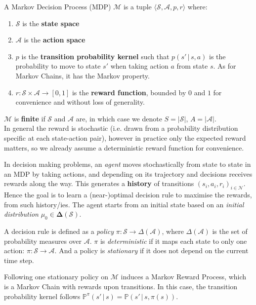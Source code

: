 \begin{defi}
  A Markov Decision Process (MDP) $\mathcal{M}$ is a tuple $\langle \mathcal{S}, \mathcal{A}, p, r \rangle$ where:
  \begin{enumerate}
  \item $\mathcal{S}$ is the \textbf{state space}
  \item $\mathcal{A}$ is the \textbf{action space}
  \item $p $ is the \textbf{transition probability kernel} such that $p(s' \,|\, s, a)$ is the probability to move to state $s'$ when taking action $a$ from state $s$. As for Markov Chains, it has the Markov property.
  \item $r: \mathcal{S} \times \mathcal{A} \to [0,1]$ is the \textbf{reward function}, bounded by $0$ and $1$ for convenience and without loss of generality.
  \end{enumerate}
  $\mathcal{M}$ is \textbf{finite} if $\mathcal{S}$ and $\mathcal{A}$ are, in which case we denote $S = |\mathcal{S}|$, $A = |\mathcal{A}|$.\\
  In general the reward is stochastic (i.e. drawn from a probability distribution specific at each state-action pair), however in practice only the expected reward matters, so we already assume a deterministic reward function for convenience.
\end{defi}

In decision making problems, an \emph{agent} moves stochastically from state to state in an MDP by taking actions, and depending on its trajectory and decisions receives rewards along the way. This generates a \textbf{history} of transitions $(s_i, a_i, r_i)_{i \in \mathcal{N}}$. Hence the goal is to learn a (near-)optimal decision rule to maximise the rewards, from such history/ies. The agent starts from an initial state based on an \emph{initial distribution} $\mu_0 \in \mathbf{\Delta}(\mathcal{S})$.

A decision rule is defined as a \emph{policy} $\pi : \mathcal{S} \to \Delta(\mathcal{A})$, where $\Delta(\mathcal{A})$ is the set of probability measures over $\mathcal{A}$. $\pi$ is \emph{deterministic} if it maps each state to only one action: $\pi : \mathcal{S} \to \mathcal{A}$. And a policy is \emph{stationary} if it does not depend on the current time step.

Following one stationary policy on $\mathcal{M}$ induces a Markov Reward Process, which is a Markov Chain with rewards upon transitions. In this case, the transition probability kernel follows $\mathbb{P}^\pi(s' \,|\, s) = \mathbb{P}(s' \,|\, s, \pi(s))$.

